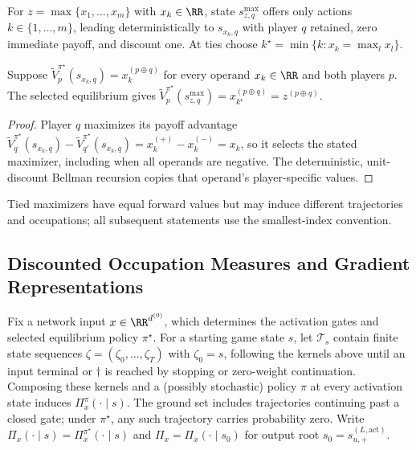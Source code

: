 \begin{definition}\label{ptnb:def:maxpool-subgame}
For $z=\max\{x_1,\dots,x_m\}$ with $x_k\in\RR$, state $s_{z,q}^{\max}$ offers only actions $k\in\{1,\dots,m\}$,
leading deterministically to $s_{x_k,q}$ with player $q$ retained, zero immediate payoff, and
discount one. At ties choose $k^\star=\min\{k:x_k=\max_l x_l\}$.
\end{definition}
\begin{proposition}\label{ptnb:prop:maxpool-equivalence}
Suppose $\tilde V_p^{\pi^\star}(s_{x_k,q})=x_k^{(p\oplus q)}$ for every operand $x_k\in\RR$ and both players $p$.
The selected equilibrium gives
$\tilde V_p^{\pi^\star}(s_{z,q}^{\max})=x_{k^\star}^{(p\oplus q)}=z^{(p\oplus q)}$.
\end{proposition}
\begin{proof}
Player $q$ maximizes its payoff advantage $\tilde V_q^{\pi^\star}(s_{x_k,q})-\tilde V_{q'}^{\pi^\star}(s_{x_k,q})=x_k^{(+)}-x_k^{(-)}=x_k$, so it selects the stated maximizer, including when all operands are negative. The deterministic, unit-discount Bellman recursion copies that operand's player-specific values.
\end{proof}
Tied maximizers have equal forward values but may induce different trajectories and occupations;
all subsequent statements use the smallest-index convention.

\subsection{Discounted Occupation Measures and Gradient Representations}\label{ptnb:app:occ-deriv}\label{subsec:gradient_occupation}

\begin{definition}\label{ptnb:def:trajectory-distribution}
Fix a network input $x\in\RR^{d^{(0)}}$, which determines the activation gates and selected equilibrium policy $\pi^\star$. For a starting game state $s$, let $\mathcal T_s$ contain finite state sequences
$\zeta=(\zeta_0,\dots,\zeta_T)$ with $\zeta_0=s$, following the kernels above until an input
terminal or $\dagger$ is reached by stopping or zero-weight continuation. Composing these kernels and a
(possibly stochastic) policy $\pi$ at every activation state induces $\Pi_x^\pi(\cdot\mid s)$.
The ground set includes trajectories continuing past a closed gate; under $\pi^\star$, any such trajectory carries probability zero. Write $\Pi_x(\cdot\mid s)=\Pi_x^{\pi^\star}(\cdot\mid s)$ and
$\Pi_x=\Pi_x(\cdot\mid s_0)$ for output root $s_0=s_{u,+}^{(L,\mathrm{act})}$.
\end{definition}

